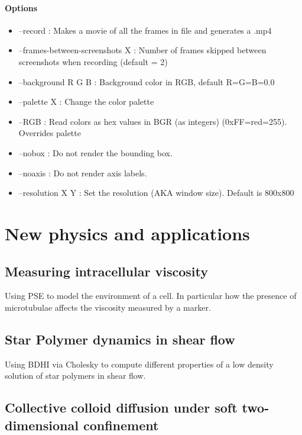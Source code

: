 \documentclass[ twoside,openright,titlepage,numbers=noenddot,%
headinclude,footinclude,cleardoublepage=empty,abstract=on,
BCOR=5mm,paper=a4,fontsize=11pt, dvipsnames
]{scrreprt}
\begin{document}
\subsection*{Options}
\begin{itemize}
\item --record :  Makes a movie of all the frames in file and generates a .mp4
\item --frames-between-screenshots X : Number of frames skipped between screenshots when recording (default = 2)
\item --background R G B : Background color in RGB, default R=G=B=0.0
\item --palette X : Change the color palette
\item --RGB : Read colors as hex values in BGR (as integers) (0xFF=red=255). Overrides palette
\item --nobox : Do not render the bounding box.
\item --noaxis : Do not render axis labels.
\item --resolution X Y : Set the resolution (AKA window size). Default is 800x800          
\end{itemize}


\newpage
\cleardoublepage
\part{New physics and applications}\label{pt:applications}
\chapter{Measuring intracellular viscosity}

Using \gls{PSE} to model the environment of a cell. In particular how the presence of microtubulae affects the viscosity measured by a marker.

\chapter{Star Polymer dynamics in shear flow}
Using \gls{BDHI} via Cholesky to compute different properties of a low density solution of star polymers in shear flow.

\chapter{Collective colloid diffusion under soft two-dimensional confinement}
\end{document}
